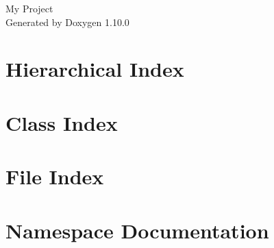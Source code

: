 \documentclass[twoside]{book}
\newcommand{\+}{\discretionary{\mbox{\scriptsize$\hookleftarrow$}}{}{}}
\newcommand{\clearemptydoublepage}{%
    \newpage{\pagestyle{empty}\cleardoublepage}%
  }
\begin{document}
  \raggedbottom
    \hypersetup{pageanchor=false,
                bookmarksnumbered=true,
                pdfencoding=unicode
               }
  \begin{titlepage}
  \vspace*{7cm}
  \begin{center}%
  {\Large My Project}\\
  \vspace*{1cm}
  {\large Generated by Doxygen 1.10.0}\\
  \end{center}
  \end{titlepage}
  \clearemptydoublepage
  \tableofcontents
  \clearemptydoublepage
  \hypersetup{pageanchor=true}







\chapter{Hierarchical Index}

\chapter{Class Index}

\chapter{File Index}

\chapter{Namespace Documentation}








\end{document}
